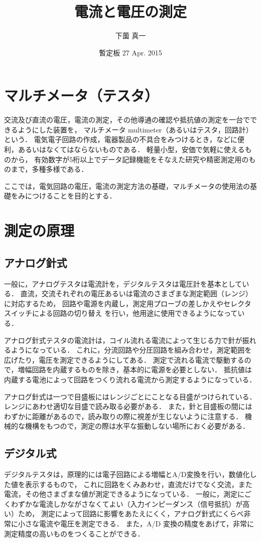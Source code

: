 \documentclass[11pt,sort]{jarticle}
\title{電流と電圧の測定}
\author{下薗 真一}
\date{暫定板 27 Apr. 2015}
\begin{document}
\maketitle

\section{マルチメータ（テスタ）}

交流及び直流の電圧，電流の測定，その他導通の確認や抵抗値の測定を一台でできるようにした装置を，
マルチメータ multimeter（あるいはテスタ，回路計）という．
電気電子回路の作成，電器製品の不具合をみつけるとき，などに便利，あるいはなくてはならないものである．
軽量小型，安価で気軽に使えるものから，
有効数字が5桁以上でデータ記録機能をそなえた研究や精密測定用のものまで，多種多様である．

ここでは，電気回路の電圧，電流の測定方法の基礎，マルチメータの使用法の基礎をみにつけることを目的とする．

\section{測定の原理}
\subsection{アナログ針式}
一般に，アナログテスタは電流計を，デジタルテスタは電圧計を基本としている．
直流，交流それぞれの電圧あるいは電流のさまざまな測定範囲（レンジ）に対応するため，
回路や電源を内蔵し，測定用プローブの差しかえやセレクタスイッチによる回路の切り替え
を行い，他用途に使用できるようになっている．

アナログ針式テスタの電流計は，コイル流れる電流によって生じる力で針が振れるようになっている．
これに，分流回路や分圧回路を組み合わせ，測定範囲を広げたり，電圧を測定できるようにしてある．
測定で流れる電流で駆動するので，増幅回路を内蔵するものを除き，基本的に電源を必要としない．
抵抗値は内蔵する電池によって回路をつくり流れる電流から測定するようになっている．

アナログ針式は一つで目盛板にはレンジごとにことなる目盛がつけられている．
レンジにあわせ適切な目盛で読み取る必要がある．
また，針と目盛板の間にはわずかに距離があるので，読み取りの際に視差が生じないように注意する．
機械的な機構をもつので，測定の際は水平な振動しない場所におく必要がある．

\subsection{デジタル式}
デジタルテスタは，原理的には電子回路による増幅とA/D変換を行い，数値化した値を表示するもので，
これに回路をくみあわせ，直流だけでなく交流，また電流，その他さまざまな値が測定できるようになっている．
一般に，測定にごくわずかな電流しかながさなくてよい（入力インピーダンス（信号抵抗）が高い）ため，
測定によって回路に影響をあたえにくく，アナログ針式にくらべ非常に小さな電流や電圧を測定できる．
また，A/D 変換の精度をあげて，非常に測定精度の高いものをつくることができる．
\end{document}
